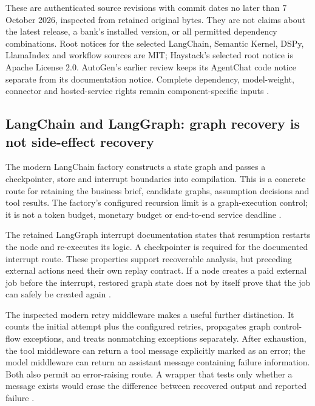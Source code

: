These are authenticated source revisions with commit dates no later than
7 October 2026, inspected from retained original bytes. They are not
claims about the latest release, a bank's installed version, or all
permitted dependency combinations. Root notices for the selected
LangChain, Semantic Kernel, DSPy, LlamaIndex and workflow sources are MIT;
Haystack's selected root notice is Apache License 2.0. AutoGen's earlier
review keeps its AgentChat code notice separate from its documentation
notice. Complete dependency, model-weight, connector and hosted-service
rights remain component-specific inputs
\cite{exec24_framework_langchain,exec24_framework_semantic_kernel,
exec24_framework_dspy,exec24_framework_llama_index,
exec24_framework_haystack,exec24_framework_workflows,v12_la04_autogen}.

\subsection{LangChain and LangGraph: graph recovery is not side-effect recovery}
The modern LangChain factory constructs a state graph and passes a
checkpointer, store and interrupt boundaries into compilation. This is
a concrete route for retaining the business brief, candidate graphs,
assumption decisions and tool results. The factory's configured recursion
limit is a graph-execution control; it is not a token budget, monetary
budget or end-to-end service deadline
\cite{exec24_framework_langchain}.

The retained LangGraph interrupt documentation states that resumption
restarts the node and re-executes its logic. A checkpointer is required
for the documented interrupt route. These properties support recoverable
analysis, but preceding external actions need their own replay contract.
If a node creates a paid external job before the interrupt, restored graph
state does not by itself prove that the job can safely be created again
\cite{v12_la04_langgraph,exec24_framework_contracts}.

The inspected modern retry middleware makes a useful further distinction.
It counts the initial attempt plus the configured retries, propagates
graph control-flow exceptions, and treats nonmatching exceptions separately.
After exhaustion, the tool middleware can return a tool message explicitly
marked as an error; the model middleware can return an assistant message
containing failure information. Both also permit an error-raising route.
A wrapper that tests only whether a message exists would erase the
difference between recovered output and reported failure
\cite{exec24_framework_langchain}.

